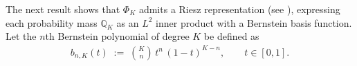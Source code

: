 \documentclass{article}
\newtheorem{theorem}{Theorem}[section]
\begin{document}
The next result shows that \(\Phi_K\) admits a Riesz representation (see \cite[Theorem~4.11]{brezis2011functional}), expressing each probability mass $\mathbb{Q}_{K}$ as an \(L^2\) inner product with a Bernstein basis function.  Let the \(n\)th Bernstein polynomial of degree \(K\) be defined as
\begin{align*}
b_{n,K}(t)
\;:=\;
\binom{K}{n}\,t^n\,(1-t)^{K-n},
\qquad
t\in[0,1].
\end{align*}


\end{document}
